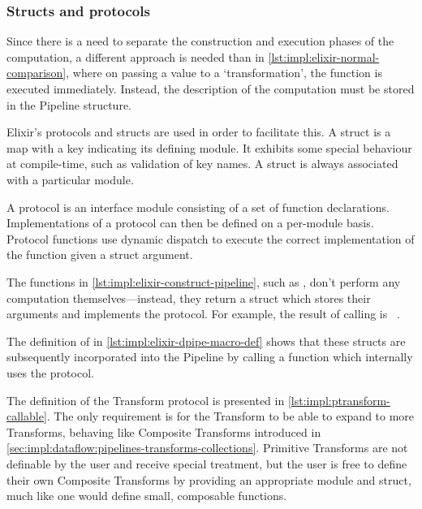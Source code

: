 \subsubsection{Structs and protocols}

Since there is a need to separate the construction and execution phases of the computation, a different approach is needed than in \cref{lst:impl:elixir-normal-comparison}, where on passing a value to a `transformation', the function is executed immediately.
Instead, the description of the computation must be stored in the Pipeline structure.

Elixir's protocols and structs are used in order to facilitate this.
A struct is a map with a  key indicating its defining module.
It exhibits some special behaviour at compile-time, such as validation of key names.
A struct is always associated with a particular module.

A protocol is an interface module consisting of a set of function declarations.
Implementations of a protocol can then be defined on a per-module basis.
Protocol functions use dynamic dispatch to execute the correct implementation of the function given a struct argument.

\begin{sloppypar}
The functions in \cref{lst:impl:elixir-construct-pipeline}, such as , don't perform any computation themselves---instead, they return a struct which stores their arguments and implements the  protocol.
For example, the result of calling  is \texttt{%
}.
\end{sloppypar}

The definition of \exs{~>} in \cref{lst:impl:elixir-dpipe-macro-def} shows that these structs are subsequently incorporated into the Pipeline by calling a function which internally uses the protocol.

The definition of the Transform protocol is presented in \cref{lst:impl:ptransform-callable}.
The only requirement is for the Transform to be able to expand to more Transforms, behaving like Composite Transforms introduced in \cref{sec:impl:dataflow:pipelines-transforms-collections}.
Primitive Transforms are not definable by the user and receive special treatment, but the user is free to define their own Composite Transforms by providing an appropriate module and struct, much like one would define small, composable functions.

